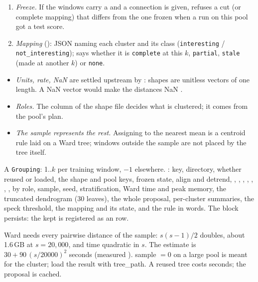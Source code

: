 \begin{enumerate}
  each cluster's sampled members; every other training row goes to the nearest centre (squared
  Euclidean). Validation, test and exam rows stay $-1$.
\item \emph{Freeze.} If the windows carry a  and a connection is given,
   refuses a cut (or complete mapping) that differs from the one
  frozen when a run on this pool got a test score.
\item \emph{Mapping} (): JSON naming each cluster and its class
  (\texttt{interesting} / \texttt{not\_interesting});  says whether it is
  \texttt{complete} at this $k$, \texttt{partial}, \texttt{stale} (made at another $k$) or
  \texttt{none}.
\end{enumerate}

\begin{itemize}
\item \emph{Units, rate, NaN} are settled upstream by : shapes
  are unitless vectors of one length. A NaN vector would make the distances NaN
  .
\item \emph{Roles.} The  column of the shape file decides what is clustered; it comes
  from the pool's plan.
\item \emph{The sample represents the rest.} Assigning to the nearest mean is a centroid rule laid
  on a Ward tree; windows outside the sample are not placed by the tree itself.
\end{itemize}

A \texttt{Grouping}: 1..$k$ per training window, $-1$ elsewhere. : key,
directory, whether reused or loaded, the shape and pool keys, frozen state, align and detrend,
, , , , ,
, ,  by role, sample, seed, stratification,
Ward time and peak memory, the truncated dendrogram (30 leaves), the whole proposal, per-cluster
summaries, the speck threshold, the mapping and its state, and the rule in words. The block
persists: the kept  is registered as an  row.

Ward needs every pairwise distance of the sample: $s(s-1)/2$ doubles, about 1.6\,GB at
$s = 20{,}000$, and time quadratic in $s$. The estimate is $30 + 90\,(s/20000)^2$ seconds
(measured ). sample $= 0$ on a large
pool is meant for the cluster; load the result with tree\_path. A reused tree costs seconds; the
proposal is cached.

